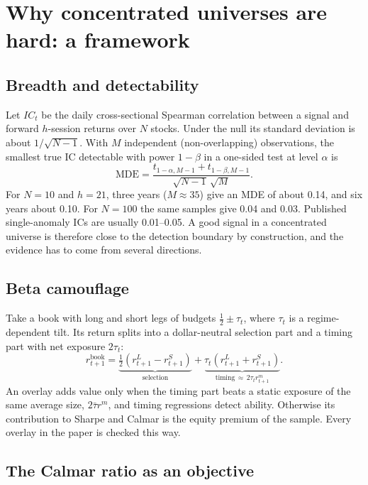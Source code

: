 \section{Why concentrated universes are hard: a framework}\label{sec:framework}

\subsection{Breadth and detectability}

Let $IC_t$ be the daily cross-sectional Spearman correlation between a signal and forward $h$-session returns over $N$ stocks. Under the null its standard deviation is about $1/\sqrt{N-1}$. With $M$ independent (non-overlapping) observations, the smallest true IC detectable with power $1-\beta$ in a one-sided test at level $\alpha$ is
\begin{equation}
\mathrm{MDE}=\frac{t_{1-\alpha,M-1}+t_{1-\beta,M-1}}{\sqrt{N-1}\,\sqrt{M}}.\label{eq:mde}
\end{equation}
For $N=10$ and $h=21$, three years ($M\approx 35$) give an MDE of about 0.14, and six years about 0.10. For $N=100$ the same samples give 0.04 and 0.03. Published single-anomaly ICs are usually 0.01--0.05. A good signal in a concentrated universe is therefore close to the detection boundary by construction, and the evidence has to come from several directions.

\subsection{Beta camouflage}

Take a book with long and short legs of budgets $\tfrac12\pm\tau_t$, where $\tau_t$ is a regime-dependent tilt. Its return splits into a dollar-neutral selection part and a timing part with net exposure $2\tau_t$:
\begin{equation}
r^{\text{book}}_{t+1}=\underbrace{\tfrac12\left(r^{L}_{t+1}-r^{S}_{t+1}\right)}_{\text{selection}}+\underbrace{\tau_t\left(r^{L}_{t+1}+r^{S}_{t+1}\right)}_{\text{timing}\,\approx\,2\tau_t r^{m}_{t+1}}.\label{eq:camouflage}
\end{equation}
An overlay adds value only when the timing part beats a static exposure of the same average size, $2\bar\tau r^m$, and timing regressions detect ability. Otherwise its contribution to Sharpe and Calmar is the equity premium of the sample. Every overlay in the paper is checked this way.

\subsection{The Calmar ratio as an objective}

